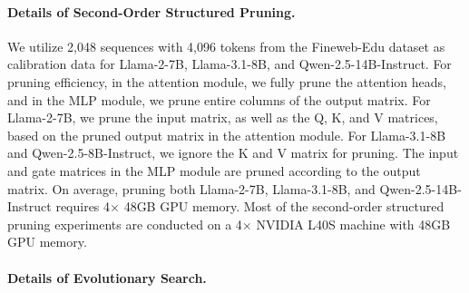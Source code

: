 \paragraph{Details of Second-Order Structured Pruning.} We utilize 2,048 sequences with 4,096 tokens from the Fineweb-Edu dataset as calibration data for Llama-2-7B, Llama-3.1-8B, and Qwen-2.5-14B-Instruct. For pruning efficiency, in the attention module, we fully prune the attention heads, and in the MLP module, we prune entire columns of the output matrix. For Llama-2-7B, we prune the input matrix, as well as the Q, K, and V matrices, based on the pruned output matrix in the attention module. For Llama-3.1-8B and Qwen-2.5-8B-Instruct, we ignore the K and V matrix for pruning. The input and gate matrices in the MLP module are pruned according to the output matrix. On average, pruning both Llama-2-7B, Llama-3.1-8B, and Qwen-2.5-14B-Instruct requires 4$\times$ 48GB GPU memory. Most of the second-order structured pruning experiments are conducted on a 4$\times$ NVIDIA L40S machine with 48GB GPU memory.

\paragraph{Details of Evolutionary Search.}

